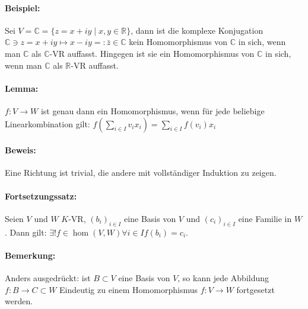 \paragraph{Beispiel:}
	Sei $V = \mathbb{C} = \{z = x+iy\mid x,y\in \mathbb{R}\}$, dann ist die komplexe Konjugation $\mathbb{C}\ni z = x+iy \mapsto x-iy =: \bar{z} \in \mathbb{C}$ kein Homomorphismus von $\mathbb{C}$ in sich, wenn man $\mathbb{C}$ als $\mathbb{C}$-VR auffasst. Hingegen ist sie ein Homomorphismus von $\mathbb{C}$ in sich, wenn man $\mathbb{C}$ als $ \mathbb{R} $-VR auffasst.
\paragraph{Lemma:}
	$f:V\to W$ ist genau dann ein Homomorphismus, wenn für jede beliebige Linearkombination gilt: $f(\sum_{i\in I}v_ix_i) = \sum_{i\in I}f(v_i)x_i$

\paragraph{Beweis:}
	Eine Richtung ist trivial, die andere mit vollständiger Induktion zu zeigen.
\paragraph{Fortsetzungssatz:} 
	Seien $ V $ und $ W $ $K$-VR, $(b_i)_{i\in I}$ eine Basis von $ V $ und $(c_i)_{i\in I}$ eine Familie in $ W $. Dann gilt: $\exists!f\in \hom(V,W) \forall i\in I f(b_i) = c_i$.
    
\paragraph{Bemerkung:}
    Anders ausgedrückt: ist $B\subset V$ eine Basis von $ V $, so kann jede Abbildung $f: B\to C\subset W$ Eindeutig zu einem Homomorphismus $f: V\to W$ fortgesetzt werden.
    
